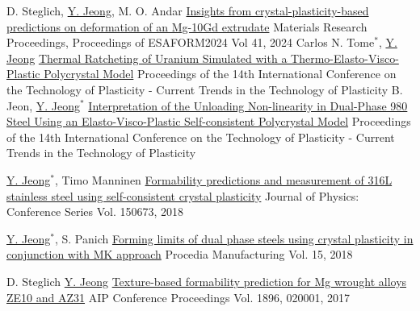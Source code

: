 \begin{cventries}

\item
  \cventry
  {D. Steglich, \underline{Y. Jeong}, M. O. Andar}
  {\href{https://doi.org/10.21741/9781644903131-121}{Insights from crystal-plasticity-based predictions on deformation of an Mg-10Gd extrudate}}
  {Materials Research Proceedings, Proceedings of ESAFORM2024}
  {Vol 41, 2024}
  {
  }
  \cventry
  {Carlos N. Tome$^*$, \underline{Y. Jeong}}
  {\href{https://doi.org/10.1007/978-3-031-40920-2_68}{Thermal Ratcheting of Uranium Simulated with a Thermo-Elasto-Visco-Plastic Polycrystal Model}}
  {Proceedings of the 14th International Conference on the Technology of Plasticity - Current Trends in the Technology of Plasticity}
  {}
  {
  }
  \cventry
  {B. Jeon, \underline{Y. Jeong}$^*$}
  {\href{https://doi.org/10.1007/978-3-031-40920-2_69}{Interpretation of the Unloading Non-linearity in Dual-Phase 980 Steel Using an Elasto-Visco-Plastic Self-consistent Polycrystal Model}}
  {Proceedings of the 14th International Conference on the Technology of Plasticity - Current Trends in the Technology of Plasticity}
  {}
  {
  }

  \cventry
  {\underline{Y. Jeong}$^*$, Timo Manninen}
  {\href{http://iopscience.iop.org/article/10.1088/1742-6596/1063/1/012020}{Formability predictions and measurement of 316L stainless steel using self-consistent crystal plasticity}}
  {Journal of Physics: Conference Series}
  {Vol. 150673, 2018}
  {
  }

  \cventry
  {\underline{Y. Jeong}$^*$, S. Panich}
  {\href{https://doi.org/10.1016/j.promfg.2018.07.209}{Forming limits of dual phase steels using crystal plasticity in conjunction with MK approach}}
  {Procedia Manufacturing}
  {Vol. 15, 2018}
  {
  }

  \cventry
  {D. Steglich \underline{Y. Jeong}}
  {\href{https://doi.org/10.1063/1.5007958}{Texture-based formability prediction for Mg wrought alloys ZE10 and AZ31}}
  {AIP Conference Proceedings}
  {Vol. 1896, 020001, 2017}
  {
  }


\end{cventries}
